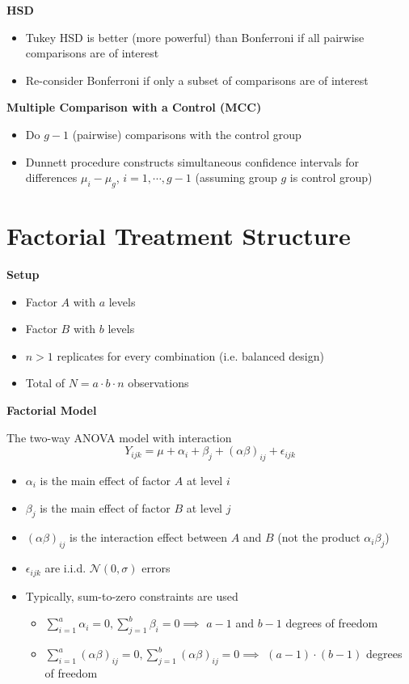 \documentclass[a4paper]{article}
\begin{document}
\textbf{HSD}
\begin{itemize}
    \item Tukey HSD is better (more powerful) than Bonferroni if all pairwise comparisons are of interest
    \item Re-consider Bonferroni if only a subset of comparisons are of interest
\end{itemize}

\textbf{Multiple Comparison with a Control (MCC)}
\begin{itemize}
    \item Do $g-1$ (pairwise) comparisons with the control group
    \item Dunnett procedure constructs simultaneous confidence intervals for differences $\mu_i-\mu_g$, $i=1,\cdots,g-1$ (assuming group $g$ is control group)
\end{itemize}

\section{Factorial Treatment Structure}

\textbf{Setup}
\begin{itemize}
    \item Factor $A$ with $a$ levels
    \item Factor $B$ with $b$ levels
    \item $n>1$ replicates for every combination (i.e. balanced design)
    \item Total of $N=a\cdot b\cdot n$ observations
\end{itemize}

\textbf{Factorial Model}

The two-way ANOVA model with interaction
\[Y_{ijk}=\mu+\alpha_i+\beta_j+(\alpha\beta)_{ij}+\epsilon_{ijk} \]
\begin{itemize}
    \item $\alpha_i$ is the main effect of factor $A$ at level $i$
    \item $\beta_j$ is the main effect of factor $B$ at level $j$
    \item $(\alpha\beta)_{ij}$ is the interaction effect between $A$ and $B$ (not the product $\alpha_i\beta_j$)
    \item $\epsilon_{ijk}$ are i.i.d. $\mathcal{N}(0,\sigma)$ errors
    \item Typically, sum-to-zero constraints are used
    \begin{itemize}
        \item $\sum_{i=1}^a\alpha_i=0,\sum_{j=1}^b\beta_i=0 \implies$ $a-1$ and $b-1$ degrees of freedom
        \item $\sum_{i=1}^a(\alpha\beta)_{ij}=0, \sum_{j=1}^b(\alpha\beta)_{ij}=0 \implies$ $(a-1)\cdot(b-1)$ degrees of freedom 
    \end{itemize}
\end{itemize}
\end{document}
